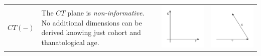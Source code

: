 \documentclass[
  12pt
]{scrartcl}
\begin{document}
\begin{center}
\begin{longtable}{m{}m{}m{}m{}}
  \midrule
  $CT(-)$ &
  The $CT$ plane is \emph{non-informative}. No additional dimensions can be derived knowing just cohort and thanatological age. &
  \includegraphics[width = \linewidth]{../fig/CT.pdf} &
  \includegraphics[width = \linewidth]{../fig/CT_iso.pdf}  \\

\end{longtable}
\end{center}
\end{document}
